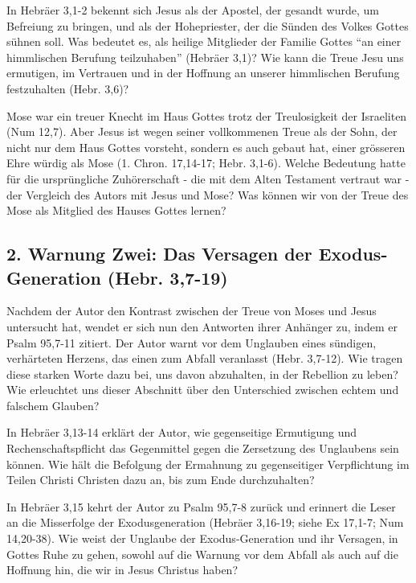\documentclass[]{book}
\begin{document}
In Hebräer 3,1-2 bekennt sich Jesus als der Apostel, der gesandt wurde,
um Befreiung zu bringen, und als der Hohepriester, der die Sünden des
Volkes Gottes sühnen soll. Was bedeutet es, als heilige Mitglieder der
Familie Gottes ``an einer himmlischen Berufung teilzuhaben'' (Hebräer
3,1)? Wie kann die Treue Jesu uns ermutigen, im Vertrauen und in der
Hoffnung an unserer himmlischen Berufung festzuhalten (Hebr. 3,6)?

Mose war ein treuer Knecht im Haus Gottes trotz der Treulosigkeit der
Israeliten (Num 12,7). Aber Jesus ist wegen seiner vollkommenen Treue
als der Sohn, der nicht nur dem Haus Gottes vorsteht, sondern es auch
gebaut hat, einer grösseren Ehre würdig als Mose (1. Chron. 17,14-17;
Hebr. 3,1-6). Welche Bedeutung hatte für die ursprüngliche Zuhörerschaft
- die mit dem Alten Testament vertraut war - der Vergleich des Autors
mit Jesus und Mose? Was können wir von der Treue des Mose als Mitglied
des Hauses Gottes lernen?

\subsection{2. Warnung Zwei: Das Versagen der Exodus-Generation (Hebr.
3,7-19)}\label{warnung-zwei-das-versagen-der-exodus-generation-hebr.-37-19}

Nachdem der Autor den Kontrast zwischen der Treue von Moses und Jesus
untersucht hat, wendet er sich nun den Antworten ihrer Anhänger zu,
indem er Psalm 95,7-11 zitiert. Der Autor warnt vor dem Unglauben eines
sündigen, verhärteten Herzens, das einen zum Abfall veranlasst (Hebr.
3,7-12). Wie tragen diese starken Worte dazu bei, uns davon abzuhalten,
in der Rebellion zu leben? Wie erleuchtet uns dieser Abschnitt über den
Unterschied zwischen echtem und falschem Glauben?

In Hebräer 3,13-14 erklärt der Autor, wie gegenseitige Ermutigung und
Rechenschaftspflicht das Gegenmittel gegen die Zersetzung des Unglaubens
sein können. Wie hält die Befolgung der Ermahnung zu gegenseitiger
Verpflichtung im Teilen Christi Christen dazu an, bis zum Ende
durchzuhalten?

In Hebräer 3,15 kehrt der Autor zu Psalm 95,7-8 zurück und erinnert die
Leser an die Misserfolge der Exodusgeneration (Hebräer 3,16-19; siehe Ex
17,1-7; Num 14,20-38). Wie weist der Unglaube der Exodus-Generation und
ihr Versagen, in Gottes Ruhe zu gehen, sowohl auf die Warnung vor dem
Abfall als auch auf die Hoffnung hin, die wir in Jesus Christus haben?
\end{document}
